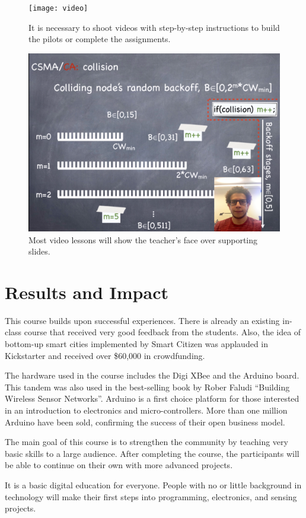 \documentclass[oneside]{book}   %
\begin{document}
\begin{figure}
\begin{center}
\texttt{[image: video]}
\caption{It is necessary to shoot videos with step-by-step instructions to build the pilots or complete the assignments.}
\label{fig:video}
\end{center}
\end{figure}
\begin{figure}
\begin{center}
\includegraphics[width=0.40\linewidth]{lesson}
\caption{Most video lessons will show the teacher's face over supporting slides.}
\label{fig:lesson}
\end{center}
\end{figure}


\chapter{Results and Impact}

This course builds upon successful experiences. There is already an existing in-class course that received very good feedback from the students. Also, the idea of bottom-up smart cities implemented by Smart Citizen was applauded in Kickstarter and received over \$60,000 in crowdfunding. 

The hardware used in the course includes the Digi XBee and the Arduino board. 
This tandem was also used in the best-selling book by Rober Faludi ``Building Wireless Sensor Networks''.
Arduino is a first choice platform for those interested in an introduction to electronics and micro-controllers.
More than one million Arduino have been sold, confirming the success of their open business model.

The main goal of this course is to strengthen the community by teaching very basic skills to a large audience. After completing the course, the participants will be able to continue on their own with more advanced projects. 

It is a basic digital education for everyone. People with no or little background in technology will make their first steps into programming, electronics, and sensing projects.
\end{document}
